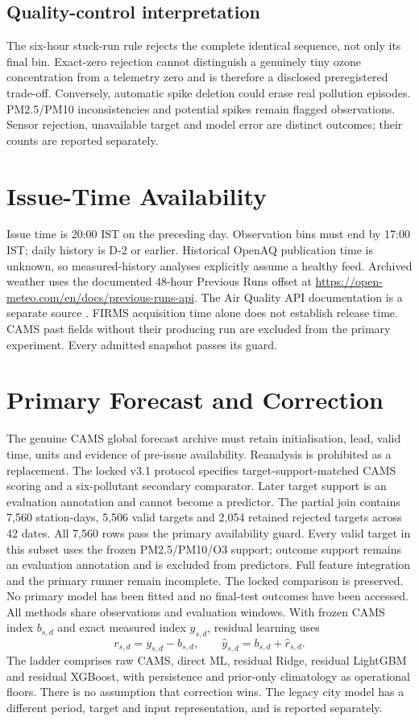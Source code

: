 \documentclass[journal]{IEEEtran}
\begin{document}
\subsection{Quality-control interpretation}
The six-hour stuck-run rule rejects the complete identical sequence, not only
its final bin. Exact-zero rejection cannot distinguish a genuinely tiny
ozone concentration from a telemetry zero and is therefore a disclosed
preregistered trade-off. Conversely, automatic spike deletion could erase
real pollution episodes. PM2.5/PM10 inconsistencies and potential spikes
remain flagged observations. Sensor rejection, unavailable target and
model error are distinct outcomes; their counts are reported separately.
\section{Issue-Time Availability}
Issue time is 20:00 IST on the preceding day. Observation bins must end by
17:00 IST; daily history is D-2 or earlier. Historical OpenAQ publication time
is unknown, so measured-history analyses explicitly assume a healthy feed.
Archived weather uses the documented 48-hour Previous Runs offset
at \url{https://open-meteo.com/en/docs/previous-runs-api}. The Air Quality API documentation is a separate
source \cite{openmeteo2026}. FIRMS acquisition time alone does not establish release
time. CAMS past fields without their producing run are excluded from the primary
experiment. Every admitted snapshot passes its guard.
\clearpage
\section{Primary Forecast and Correction}
The genuine CAMS global forecast archive \cite{cams2024forecasts} must retain
initialisation, lead, valid time, units and evidence of pre-issue availability.
Reanalysis is prohibited as a replacement. The locked v3.1 protocol specifies
target-support-matched CAMS scoring and a six-pollutant secondary comparator.
Later target support is an evaluation annotation and cannot become a predictor.
The partial join contains 7,560 station-days, 5,506 valid targets and 2,054 retained rejected targets across 42 dates. All 7,560 rows pass the primary availability guard. Every valid target in this subset uses the frozen PM2.5/PM10/O3 support; outcome support remains an evaluation annotation and is excluded from predictors. Full feature integration and the primary runner remain incomplete. The locked comparison is preserved. No primary model has been fitted and no final-test outcomes have been accessed.
All methods share observations and evaluation windows. With frozen CAMS index
$b_{s,d}$ and exact measured index $y_{s,d}$, residual learning uses
\begin{equation}r_{s,d}=y_{s,d}-b_{s,d},\qquad
\widehat y_{s,d}=b_{s,d}+\widehat r_{s,d}.\end{equation}
The ladder comprises raw CAMS, direct ML, residual Ridge, residual LightGBM and
residual XGBoost, with persistence and prior-only climatology as operational
floors. There is no assumption that correction wins. The legacy city model has
a different period, target and input representation, and is reported separately.
\end{document}
